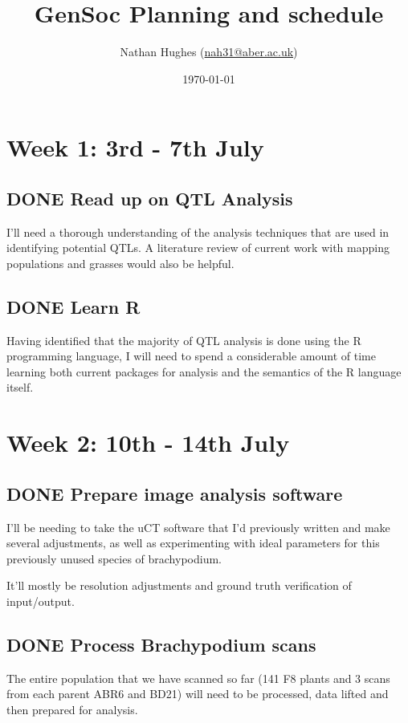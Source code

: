 \documentclass[a4paper]{article}
\author{Nathan Hughes (\href{mailto:nah31@aber.ac.uk}{nah31@aber.ac.uk})}
\date{\today}
\title{GenSoc Planning and schedule}
\begin{document}
\maketitle
\maketitle
\clearpage
\tableofcontents
\clearpage


\section{Week 1: 3rd - 7th July}
\label{sec-1}

\subsection{{\bfseries\sffamily DONE} Read up on QTL Analysis}
\label{sec-1-1}
I'll need a thorough understanding of the analysis techniques that are used in identifying potential QTLs. 
A literature review of current work with mapping populations and grasses would also be helpful.  


\subsection{{\bfseries\sffamily DONE} Learn R}
\label{sec-1-2}
Having identified that the majority of QTL analysis is done using the R programming language, I will need to spend a considerable amount of time 
learning both current packages for analysis and the semantics of the R language itself. 

\section{Week 2: 10th - 14th July}
\label{sec-2}

\subsection{{\bfseries\sffamily DONE} Prepare image analysis software}
\label{sec-2-1}
I'll be needing to take the uCT software that I'd previously written and make several adjustments, as well as experimenting with ideal  parameters for this previously 
unused species of brachypodium. 

It'll mostly be resolution adjustments and ground truth verification of input/output.

\subsection{{\bfseries\sffamily DONE} Process Brachypodium scans}
\label{sec-2-2}
The entire population that we have scanned so far (141 F8 plants and 3 scans from each parent ABR6 and BD21) will need to be processed, data lifted and then prepared for analysis. 
\end{document}
